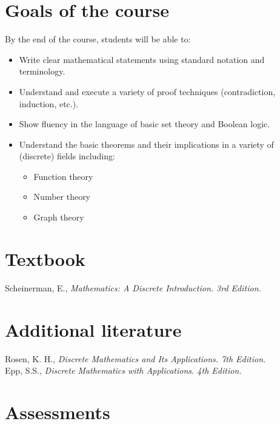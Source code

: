 \documentclass[10pt]{article}
\theoremstyle{definition}
\begin{document}
\section*{Goals of the course}
By the end of the course, students will be able to:
\begin{itemize}
\item Write clear mathematical statements using standard notation and terminology.
\item Understand and execute a variety of proof techniques (contradiction, induction, etc.).
\item Show fluency in the language of basic set theory and Boolean logic.
\item Understand the basic theorems and their implications in a variety of (discrete) fields including:
\begin{itemize}
\item Function theory
\item Number theory
\item Graph theory
\end{itemize}
\end{itemize}

\section*{Textbook}

Scheinerman, E., \emph{Mathematics: A Discrete Introduction. 3rd Edition.}

\section*{Additional literature}

Rosen, K. H., \emph{Discrete Mathematics and Its Applications. 7th Edition.}\\

\noindent Epp, S.S., \emph{Discrete Mathematics with Applications. 4th Edition.}

\section*{Assessments}
\end{document}
